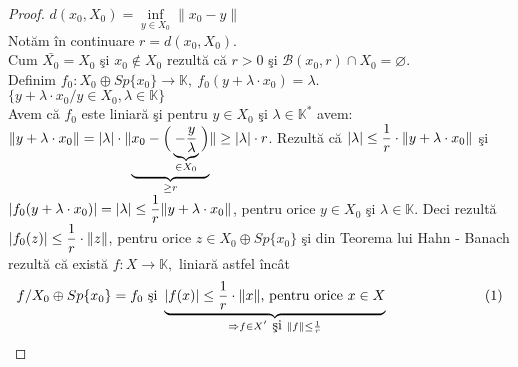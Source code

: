 \documentclass[ a4paper, 12pt]{report}
\theoremstyle{definition}
\theoremstyle{remark}
\numberwithin{equation}{section}
\begin{document}
\begin{proof}
$d(x_0,X_0) = \inf\limits_{y \in X_0} \lVert x_0 - y \rVert$\\
Not\u am \^in continuare $r = d(x_0,X_0).$\\
Cum $\bar{X_0} = X_0$ \c si $x_0 \notin X_0$ rezult\u a c\u a $r>0$ \c si
$\mathcal{B}(x_0,r) \cap X_0 = \varnothing$.\\
Definim $f_0 : X_0\oplus Sp\{x_0\} \rightarrow \mathbb{K},\  f_0(y + \lambda \cdot x_0) = \lambda.$\\
$\{ y + \lambda \cdot x_0 / y \in X_0, \lambda \in \mathbb{K} \}$\\
Avem c\u a $f_0$ este liniar\u a \c si pentru $y \in X_0$ \c si $\lambda \in \mathbb{K}^{\ast}$ avem:\\
$\lVert  y + \lambda \cdot x_0 \rVert = \lvert \lambda \rvert \cdot \lVert \underbrace{ x_0 - \Big(\underbrace{-\displaystyle\frac{y}{\lambda}}_{\in X_0}\Big)}_{\geq r} \rVert \geq \lvert \lambda \rvert \cdot r$. Rezult\u a c\u a $\lvert \lambda \rvert \leq \displaystyle\frac{1}{r} \cdot \lVert y+\lambda \cdot x_0 \rVert$ \c si $\lvert f_0(y + \lambda \cdot x_0) \rvert = \lvert \lambda \rvert \leq \displaystyle\frac{1}{r}\lVert y + \lambda \cdot x_0  \rVert$, pentru orice $y \in X_0$ \c si $\lambda \in \mathbb{K}$. Deci rezult\u a  $\lvert f_0(z) \rvert \leq \displaystyle\frac{1}{r} \cdot \lVert z \rVert$, pentru orice $z \in X_0 \oplus Sp\{x_0\}$ \c si din Teorema lui Hahn - Banach rezult\u a c\u a exist\u a  $f : X \rightarrow \mathbb{K},$ liniar\u a astfel \^inc\^at\\
 \[f / X_0 \oplus Sp\{ x_0 \} = f_0\ \mbox{\c si}\ \underbrace{\lvert f(x) \rvert \leq \frac{1}{r} \cdot \lVert x \rVert \hbox{, pentru orice } x \in X}_{ \Rightarrow f \in X^{'}\ \mbox{\c si}\  \lVert f  \rVert \leq \frac{1}{r}}\hspace{2.5cm} (1)\]
































\end{proof}
\end{document}
